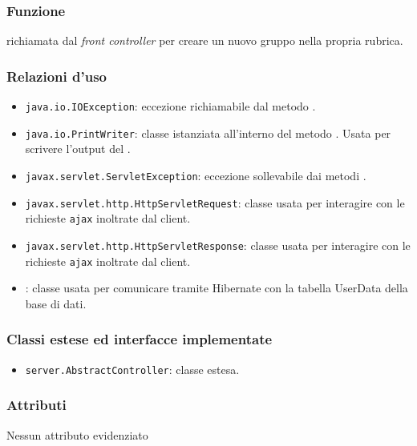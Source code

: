 

\subsubsection*{Funzione}
 richiamata dal \textit{front controller} per creare un nuovo gruppo nella propria rubrica.

\subsubsection*{Relazioni d'uso}

\begin{itemize}
	\item \texttt{java.io.IOException}: eccezione richiamabile dal metodo .
	\item \texttt{java.io.PrintWriter}: classe istanziata all'interno del metodo . Usata per scrivere l'output del .
	\item \texttt{javax.servlet.ServletException}: eccezione sollevabile dai metodi .
	\item \texttt{javax.servlet.http.HttpServletRequest}: classe usata per interagire con le richieste \texttt{ajax} inoltrate dal client.
	\item \texttt{javax.servlet.http.HttpServletResponse}: classe usata per interagire con le richieste \texttt{ajax} inoltrate dal client.
	\item {}: classe usata per comunicare tramite Hibernate con la tabella UserData della base di dati.
\end{itemize}

\subsubsection*{Classi estese ed interfacce implementate}
\begin{itemize}
	\item \texttt{server.AbstractController}: classe estesa.
\end{itemize}

\subsubsection*{Attributi}

Nessun attributo evidenziato


